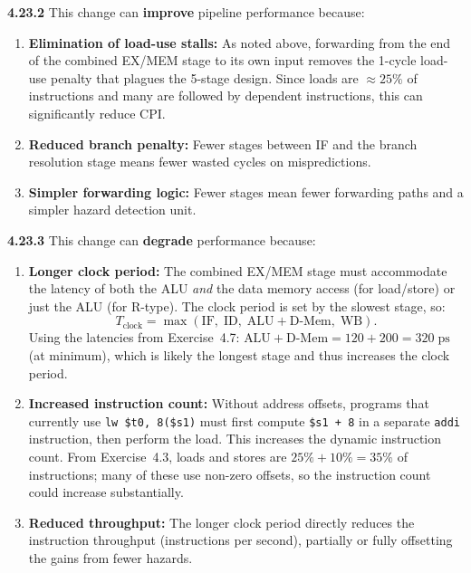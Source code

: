 \medskip\noindent\textbf{4.23.2}
This change can \textbf{improve} pipeline performance because:
\begin{enumerate}
  \item \textbf{Elimination of load-use stalls:} As noted above, forwarding
        from the end of the combined EX/MEM stage to its own input removes
        the 1-cycle load-use penalty that plagues the 5-stage design.  Since
        loads are $\approx 25\%$ of instructions and many are followed by
        dependent instructions, this can significantly reduce CPI.
  \item \textbf{Reduced branch penalty:} Fewer stages between IF and the
        branch resolution stage means fewer wasted cycles on mispredictions.
  \item \textbf{Simpler forwarding logic:} Fewer stages mean fewer forwarding
        paths and a simpler hazard detection unit.
\end{enumerate}

\medskip\noindent\textbf{4.23.3}
This change can \textbf{degrade} performance because:
\begin{enumerate}
  \item \textbf{Longer clock period:} The combined EX/MEM stage must
        accommodate the latency of both the ALU \emph{and} the data memory
        access (for load/store) or just the ALU (for R-type).  The clock
        period is set by the slowest stage, so:
        \[
          T_{\text{clock}} = \max(\text{IF},\; \text{ID},\;
            \text{ALU} + \text{D-Mem},\; \text{WB}).
        \]
        Using the latencies from Exercise~4.7:
        $\text{ALU} + \text{D-Mem} = 120 + 200 = 320\;\text{ps}$ (at
        minimum), which is likely the longest stage and thus increases the
        clock period.
  \item \textbf{Increased instruction count:} Without address offsets,
        programs that currently use \texttt{lw \$t0, 8(\$s1)} must first
        compute \texttt{\$s1 + 8} in a separate \texttt{addi} instruction,
        then perform the load.  This increases the dynamic instruction count.
        From Exercise~4.3, loads and stores are $25\% + 10\% = 35\%$ of
        instructions; many of these use non-zero offsets, so the instruction
        count could increase substantially.
  \item \textbf{Reduced throughput:} The longer clock period directly reduces
        the instruction throughput (instructions per second), partially or
        fully offsetting the gains from fewer hazards.
\end{enumerate}

